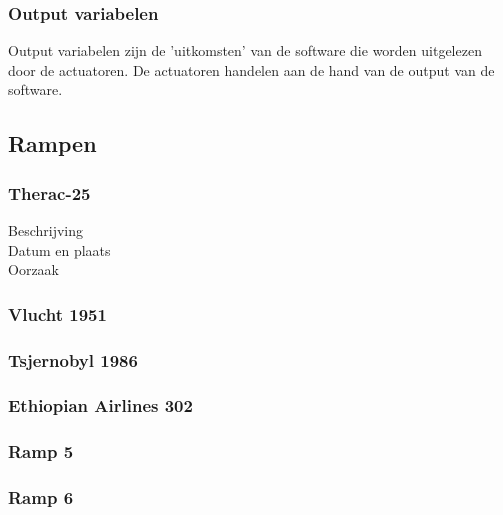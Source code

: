 \documentclass{article}%
\begin{document}
\subsubsection{Output variabelen}
Output variabelen zijn de 'uitkomsten' van de software die worden uitgelezen door de actuatoren. De actuatoren handelen aan de hand van de output van de software.

\subsection{Rampen}

\subsubsection{Therac-25}
\begin{description}
\item[Beschrijving]
\item[Datum en plaats] 
\item[Oorzaak]
\end{description}

\subsubsection{Vlucht 1951}

\subsubsection{Tsjernobyl 1986}

\subsubsection{Ethiopian Airlines 302}

\subsubsection{Ramp 5}
\subsubsection{Ramp 6}




\clearpage %
\end{document}
